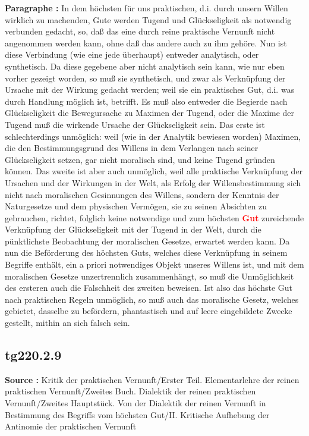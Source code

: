 \documentclass[a4paper,12pt,twoside]{book}
\newcommand{\match}[1]{\textcolor{red}{\textbf{#1}}}
\begin{document}
	\textbf{Paragraphe : }In dem höchsten für uns praktischen, d.i. durch unsern Willen wirklich zu machenden, Gute werden Tugend und Glückseligkeit als notwendig verbunden gedacht, so, daß das eine durch reine praktische Vernunft nicht angenommen werden kann, ohne daß das andere auch zu ihm gehöre. Nun ist diese Verbindung (wie eine jede überhaupt) entweder analytisch, oder synthetisch. Da diese gegebene aber nicht analytisch sein kann, wie nur eben vorher gezeigt worden, so muß sie synthetisch, und zwar als Verknüpfung der Ursache mit der Wirkung gedacht werden; weil sie ein praktisches Gut, d.i. was durch Handlung möglich ist, betrifft. Es muß also entweder die Begierde nach Glückseligkeit die Bewegursache zu Maximen der Tugend, oder die Maxime der Tugend muß die wirkende Ursache der Glückseligkeit sein. Das erste ist schlechterdings unmöglich: weil (wie in der Analytik bewiesen worden) Maximen, die den Bestimmungsgrund des Willens in dem Verlangen nach seiner Glückseligkeit setzen, gar nicht moralisch sind, und keine Tugend gründen können. Das zweite ist aber auch unmöglich, weil alle praktische Verknüpfung der Ursachen und der Wirkungen in der Welt, als Erfolg der Willensbestimmung sich nicht nach moralischen Gesinnungen des Willens, sondern der Kenntnis der Naturgesetze und dem physischen Vermögen, sie zu seinen Absichten zu gebrauchen, richtet, folglich keine notwendige und zum höchsten \match{Gut} zureichende Verknüpfung der Glückseligkeit mit der Tugend in der Welt, durch die pünktlichste Beobachtung der moralischen Gesetze, erwartet werden kann. Da nun die Beförderung des höchsten Guts, welches diese Verknüpfung in seinem Begriffe enthält, ein a priori notwendiges Objekt unseres Willens ist, und mit dem moralischen Gesetze unzertrennlich zusammenhängt, so muß die Unmöglichkeit des ersteren auch die Falschheit des zweiten beweisen. Ist also das höchste Gut nach praktischen Regeln unmöglich, so muß auch das moralische Gesetz, welches gebietet, dasselbe  zu befördern, phantastisch und auf leere eingebildete Zwecke gestellt, mithin an sich falsch sein. 
	
	\subsection*{tg220.2.9} 
	\textbf{Source : }Kritik der praktischen Vernunft/Erster Teil. Elementarlehre der reinen praktischen Vernunft/Zweites Buch. Dialektik der reinen praktischen Vernunft/Zweites Hauptstück. Von der Dialektik der reinen Vernunft in Bestimmung des Begriffs vom höchsten Gut/II. Kritische Aufhebung der Antinomie der praktischen Vernunft\\  
	
\end{document}
